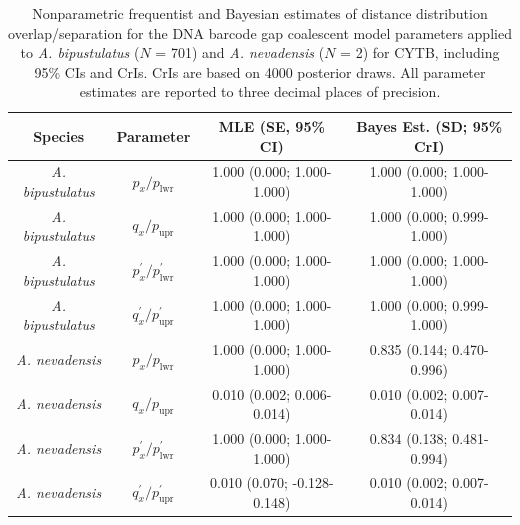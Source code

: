 \documentclass[12pt]{article}
\begin{document}
\begin{table}[H]

\small

\centering

\caption{Nonparametric frequentist and Bayesian estimates of distance distribution overlap/separation for the DNA barcode gap coalescent model parameters applied to \textit{A. bipustulatus} ($N$ = 701) and \textit{A. nevadensis} ($N$ = 2) for CYTB, including 95\%  CIs and CrIs. CrIs are based on 4000 posterior draws. All parameter estimates are reported to three decimal places of precision.}

\begin{tabular}{cccc} \hline

\textbf{Species} & \textbf{Parameter} & \textbf{MLE (SE, 95\% CI)} & \textbf{Bayes Est. (SD; 95\% CrI)} \\  \hline
\textit{A. bipustulatus} & $p_x/p_\mathrm{lwr}$ & 1.000 (0.000; 1.000-1.000) & 1.000 (0.000; 1.000-1.000) \\
\textit{A. bipustulatus} & $q_x/p_\mathrm{upr}$ & 1.000 (0.000; 1.000-1.000) & 1.000 (0.000; 0.999-1.000) \\
\textit{A. bipustulatus} & $p^{'}_x/p^{'}_\mathrm{lwr}$ & 1.000 (0.000; 1.000-1.000) & 1.000 (0.000; 1.000-1.000)  \\
\textit{A. bipustulatus} & $q^{'}_x/p^{'}_\mathrm{upr}$ & 1.000 (0.000; 1.000-1.000) & 1.000 (0.000; 0.999-1.000) \\


\textit{A. nevadensis} & $p_x/p_\mathrm{lwr}$ & 1.000 (0.000; 1.000-1.000) & 0.835 (0.144; 0.470-0.996) \\
\textit{A. nevadensis} & $q_x/p_\mathrm{upr}$ & 0.010 (0.002; 0.006-0.014) & 0.010 (0.002; 0.007-0.014) \\
\textit{A. nevadensis} &  $p^{'}_x/p^{'}_\mathrm{lwr}$ & 1.000 (0.000; 1.000-1.000) & 0.834 (0.138; 0.481-0.994) \\
\textit{A. nevadensis} &  $q^{'}_x/p^{'}_\mathrm{upr}$ & 0.010 (0.070; -0.128-0.148) & 0.010 (0.002; 0.007-0.014) \\


\hline


\end{tabular}

\end{table}
\end{document}
